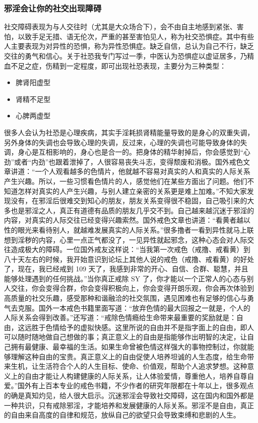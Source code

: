 \subsubsection{邪淫会让你的社交出现障碍}

社交障碍表现为与人交往时（尤其是大众场合下），会不由自主地感到紧张、害怕，以致手足无措、语无伦次，严重的甚至害怕见人，称为社交恐惧症。其中有些人主要表现为对异性的恐惧，称为异性恐惧症。缺乏自信，总认为自己不行，缺乏交往的勇气和信心。关于社恐我专门写过一季，中医认为恐惧症以虚证居多，乃精血不足之症，伤精到一定程度，即可出现社恐表现，主要分为三种类型：

\begin{multicols}{3}
    \begin{itemize}
        \item 脾肾阳虚型
        \item 肾精不足型
        \item 心脾两虚型
    \end{itemize}
\end{multicols}

很多人会认为社恐是心理疾病，其实手淫耗损肾精能量导致的是身心的双重失调，另外身体的失调也会导致心理的失调，反过来，心理的失调也可能导致身体的失调，身心是互相影响的，身心也是合一的。把身体的精华射掉后，你会感觉到“心劲”或者“内劲”也跟着泄掉了，人很容易丧失斗志，变得颓废和消极。国外戒色文章讲道：“一个人观看越多的色情片，他就越不容易对真实的人和真实的人际关系产生兴趣。所以，一些习惯看色情片的人，感觉他们在某些方面出了问题。他们不知道怎样对真实的人产生兴趣，与别人建立亲密的关系更是难上加难。”不知大家发现没有，在邪淫后很难交到知心的朋友，朋友关系变得很不稳固，自己吸引来的大多也是邪淫之人，真正有道德有品质的朋友几乎交不到。自己越来越沉迷于邪淫的内容，对真实的人际交往已经变得兴趣索然。国外戒色文章也讲道：“看黄者越以性的眼光来看待别人，就越难发展真实的人际关系。”很多撸者一看到异性就马上联想到淫秽的内容，心里一点正气都没了，一见异性就起邪念，这种心态会对人际交往造成极大的障碍。一位国外戒友这样说：“当我第一次戒色（戒撸、戒看黄）到八十天左右的时候，我开始意识到论坛上其他人说的戒色（戒撸、戒看黄）的好处了，现在，我已经戒到 109 天了，我感到非常的开心、自信、合群、聪慧，并且能够处理遇到的任何挑战。”当你真正戒除 SY 了，你才能以一个正常人的心态与别人交往，你会变得合群，你会变得积极向上，你会变得开朗乐观，你会再次体验到高质量的社交乐趣，感受那种和谐融洽的社交氛围，遇见困难也有足够的信心与勇气去克服。国外一本戒色书籍里面写道：“放弃色情的最大回报之一就是，个人的人际关系会得到改善。”还写道：“戒除色情瘾给生命带来最重要的奖励就是：自由，这远胜于色情给予的虚拟快感。这里所说的自由并不是指字面上的自由，即人可以随时随地做自己想做的事；真正意义上的自由是指能够作出明智的决定，让自己拥有最健康、最幸福的生活。如果生命曾被色情这样强大的事物控制过，你就能够理解这种自由的宝贵。真正意义上的自由促使人培养坦诚的人生态度，给生命带来生机，让生活符合个人的人生目标、使命、价值观，帮助个人追求梦想。这种意义上的自由才能让人构建健康的人际关系，让人体验爱情，尊重他人，培养自尊自爱。”国外有上百本专业的戒色书籍，不少作者的研究年限都在十年以上，很多观点的确是真知灼见，给人很大启示。沉迷邪淫会导致社交障碍，这在国内和国外都是一种共识，只有戒除邪淫，才能培养和发展健康的人际关系。邪淫不是自由，真正的自由来自高度的自律和规范，放纵自己的欲望只会导致束缚和悲剧的人生。

